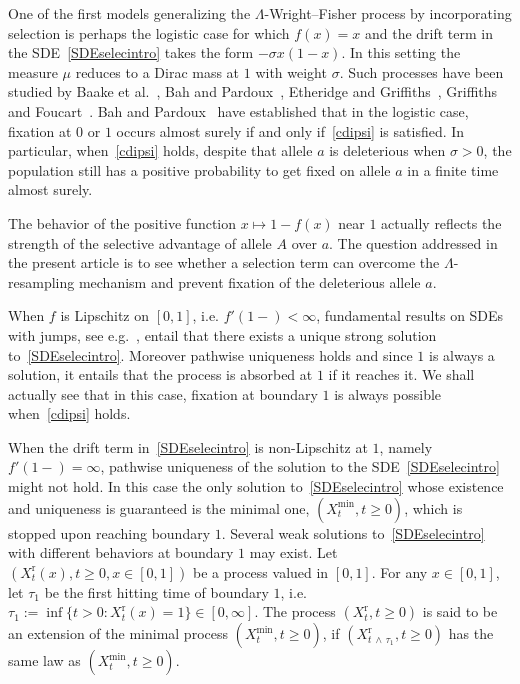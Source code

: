 \documentclass[10pt]{amsart}
\theoremstyle{definition}\newtheorem{defi}[theo]{Definition}\newtheorem{rema}[theo]{Remark}\newtheorem{exam}[theo]{Example}\newtheorem{exem}[theo]{Example}\newtheorem{nota}[theo]{Notation}
\newcommand{\rmr}{\mathrm{r}}
\begin{document}
One of the first models generalizing the $\Lambda$-Wright--Fisher process by incorporating selection is perhaps the logistic case for which $f(x)=x$ and the drift term in the SDE~\eqref{SDEselecintro} takes the form $-\sigma x(1-x)$. In this setting the measure $\mu$ reduces to a Dirac mass at $1$ with weight $\sigma$. Such processes have been studied by Baake et al.~\cite{baake2016}, Bah and Pardoux~\cite{zbMATH06403252}, Etheridge and Griffiths~\cite{zbMATH05832932}, Griffiths~\cite{zbMATH06387922} and Foucart~\cite{zbMATH06346921}. Bah and Pardoux~\cite[Theorem~4.3]{zbMATH06403252} have established that in the logistic case, fixation at $0$ or $1$ occurs almost surely if and only if~\eqref{cdipsi} is satisfied. In particular, when~\eqref{cdipsi} holds, despite that allele $a$ is deleterious when $\sigma>0$, the population still has a positive probability to get fixed on allele $a$ in a finite time almost surely.

The behavior of the positive function $x\mapsto 1-f(x)$ near $1$ actually reflects the strength of the selective advantage of allele $A$ over $a$. The question addressed in the present article is to see whether a selection term can overcome the $\Lambda$-resampling mechanism and prevent fixation of the deleterious allele $a$.

When $f$ is Lipschitz on $[0,1]$, i.e. $f'(1-)<\infty$, fundamental results on SDEs with jumps, see e.g.~\cite{DawsonLi}, entail that there exists a unique strong solution to~\eqref{SDEselecintro}. Moreover pathwise uniqueness holds and since $1$ is always a solution, it entails that the process is absorbed at $1$ if it reaches it. We shall actually see that in this case, fixation at boundary $1$ is always possible when~\eqref{cdipsi} holds.

When the drift term in~\eqref{SDEselecintro} is non-Lipschitz at $1$, namely $f'(1-)=\infty$, pathwise uniqueness of the solution to the SDE~\eqref{SDEselecintro} might not hold. In this case the only solution to~\eqref{SDEselecintro} whose existence and uniqueness is guaranteed is the minimal one, $(X_t^{\min},t\geq 0)$, which is stopped upon reaching boundary $1$. Several weak solutions to~\eqref{SDEselecintro} with different behaviors at boundary $1$ may exist. Let $(X^{\rmr}_t(x),t\geq 0,x\in [0,1])$ be a process valued in $[0,1]$. For any $x\in [0,1]$, let $\tau_1$ be the first hitting time of boundary $1$, i.e. $\tau_1:=\inf\{t>0: X^{\rmr}_t(x)=1\}\in [0,\infty]$. The process $(X^{\rmr}_t,t\geq 0)$ is said to be an extension of the minimal process $(X^{\min}_t,t\geq 0)$, if $(X^{\rmr}_{t\,\wedge\,\tau_1},t\geq 0)$ has the same law as $(X^{\min}_t,t\geq 0)$.
\end{document}
